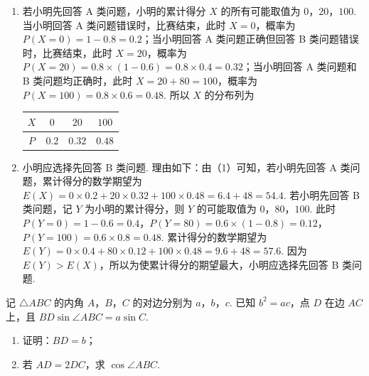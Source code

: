 \begin{solution}
\begin{enumerate}
    \item 若小明先回答 A 类问题，小明的累计得分 \(X\) 的所有可能取值为 \(0\)，\(20\)，\(100\). 当小明回答 A 类问题错误时，比赛结束，此时 \(X=0\)，概率为 \(P(X=0)=1-0.8=0.2\)；当小明回答 A 类问题正确但回答 B 类问题错误时，比赛结束，此时 \(X=20\)，概率为 \(P(X=20)=0.8\times(1-0.6)=0.8\times0.4=0.32\)；当小明回答 A 类问题和 B 类问题均正确时，此时 \(X=20+80=100\)，概率为 \(P(X=100)=0.8\times0.6=0.48\). 所以 \(X\) 的分布列为
    \begin{center}
    \begin{tabular}{c|ccc}
    \(X\) & \(0\) & \(20\) & \(100\) \\
    \hline
    \(P\) & \(0.2\) & \(0.32\) & \(0.48\)
    \end{tabular}
    \end{center}
    \item 小明应选择先回答 B 类问题. 理由如下：由（1）可知，若小明先回答 A 类问题，累计得分的数学期望为 \(E(X)=0\times0.2+20\times0.32+100\times0.48=6.4+48=54.4\). 若小明先回答 B 类问题，记 \(Y\) 为小明的累计得分，则 \(Y\) 的可能取值为 \(0\)，\(80\)，\(100\). 此时 \(P(Y=0)=1-0.6=0.4\)，\(P(Y=80)=0.6\times(1-0.8)=0.12\)，\(P(Y=100)=0.6\times0.8=0.48\). 累计得分的数学期望为 \(E(Y)=0\times0.4+80\times0.12+100\times0.48=9.6+48=57.6\). 因为 \(E(Y)>E(X)\)，所以为使累计得分的期望最大，小明应选择先回答 B 类问题.
\end{enumerate}
\end{solution}

\begin{problem}
记 \(\triangle ABC\) 的内角 \(A\)，\(B\)，\(C\) 的对边分别为 \(a\)，\(b\)，\(c\). 已知 \(b^2=ac\)，点 \(D\) 在边 \(AC\) 上，且 \(BD\sin\angle ABC=a\sin C\).

\begin{enumerate}
\item 证明：\(BD=b\)；
\item 若 \(AD=2DC\)，求 \(\cos\angle ABC\).
\end{enumerate}
\end{problem}

